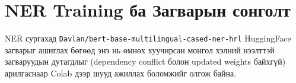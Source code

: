 \section{NER Training ба Загварын сонголт}
NER сургахад \texttt{Davlan/bert-base-multilingual-cased-ner-hrl} HuggingFace загварыг ашиглах бөгөөд энэ нь өмнөх хуучирсан монгол хэлний нээлттэй загваруудын дутагдлыг (dependency conflict болон updated weights байхгүй) арилгаснаар Colab дээр шууд ажиллах боломжийг олгож байна.
